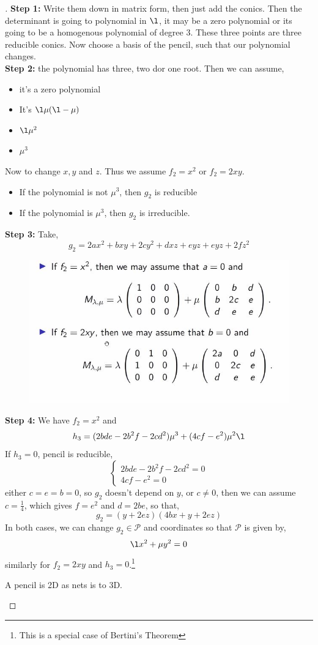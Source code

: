 \documentclass{article}
\begin{document}
\begin{proof}[]
  \textbf{Step 1:}
  Write them down in matrix form, then just add the conics. Then the determinant is going to polynomial in $\l$, it may be a zero polynomial or its going to be a homogenous polynomial of degree 3. These three points are three reducible conics. Now choose a basis of the pencil, such that our polynomial changes.\\
  \textbf{Step 2: } the polynomial has three, two dor one root. Then we can assume,
  \begin{itemize}
    \item it's a zero polynomial
    \item It's $\l \mu (\l - \mu)$
    \item $\l \mu ^2$
    \item $\mu ^3$
  \end{itemize}
  Now to change $x, y$ and $z$. Thus we assume $f_2 = x^2$ or $f_2 = 2xy$.
  \begin{itemize}
    \item If the polynomial is not $\mu^3$, then $g_2$ is reducible
    \item If the polynomial is $\mu ^ 3$, then $g_2$ is irreducible.\\
  \end{itemize}
  \textbf{Step 3:} Take,
  $$ g_2 = 2ax^2 + bxy + 2cy^2 + dxz + eyz + eyz + 2fz^2 $$

  \begin{figure}[!ht]
  \centering
  \includegraphics{./figures/L4.2}
  \end{figure}

  \textbf{Step 4:} We have $f_2 = x^2$ and
  $$ h_3 = (2bde - 2b^2f - 2cd^2)\mu^3 + (4cf - e^2)\mu^2 \l $$
  If $h_3 = 0$, pencil is reducible,
  $$ \begin{cases}
    2bde - 2b^2f - 2cd^2 = 0\\
    4cf - e^2 = 0
  \end{cases} $$
  either $c = e = b = 0$, so $g_2$ doesn't depend on $y$, or $c \ne 0$, then we can assume $c = \frac{1}{4}$, which gives $f = e^2$ and $d = 2be$, so that,
  $$ g_2 = (y + 2ez)(4bx + y + 2ez) $$
  In both cases, we can change $g_2 \in \mathcal{P}$ and coordinates so that $\mathcal{P}$ is given by,
  $$ \l x^2 + \mu y^2 = 0 $$
  similarly for $f_2 = 2xy$ and $h_3 = 0$.\footnote{This is a special case of Bertini's Theorem}
  \begin{remark}
     A pencil is 2D as nets is to 3D.
  \end{remark}


\end{proof}
\end{document}
